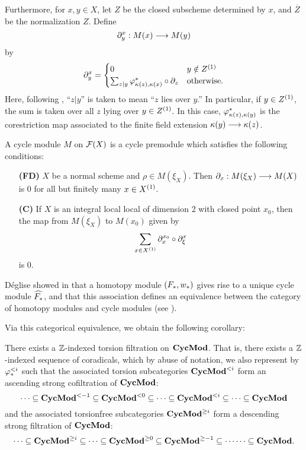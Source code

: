 Furthermore, for $x, y \in X$, let $Z$ be the closed subscheme 
determined by $x$, and $\overline{Z}$ be the normalization $Z$.
Define
\[
\ptres{x}{y}: M(x) \to M(y)
\]
by
\[
\ptres{x}{y} = 
\begin{cases}
0 & y \notin \subsch{1}{Z} \\
\sum_{z|y} \phi_{\resf{z},\resf{x}}^* \comp \res{z} & \textrm{otherwise}.
\end{cases}
\]
Here, following \cite{Rost96}, ``$z|y$'' is taken to mean ``$z$ 
lies over $y$.'' In particular, if $y \in \subsch{1}{Z}$, the sum 
is taken over all $z$ lying over $y \in \subsch{1}{Z}$. In this
case, $\phi_{\resf{z},\resf{y}}^*$ is the corestriction map 
associated to the finite field extension $\resf{y} \to \resf{z}$.

\begin{defn}
A cycle module $M$ on $\fields(X)$ is a cycle premodule which
satisfies the following conditions:

\begin{enumerate}
\item[\textbf{(FD)}]  
$X$ be a normal scheme and $\rho \in M(\xi_X)$. Then $\res{x}: 
M(\xi_X) \to M(X)$ is 0 for all but finitely many $x \in 
\subsch{1}{X}$.

\item[\textbf{(C)}]  If $X$ is an integral
local local of dimension 2 with closed point $x_0$, then the map 
from $M(\xi_X)$ to $M(x_0)$ given by
\[
\sum_{x \in \subsch{1}{X}} \ptres{x_0}{x} \comp \ptres{x}{\xi}
\]
is 0.
\end{enumerate}
\end{defn}

D\'eglise showed in \cite{DegModHom} that a homotopy module $(F_*, 
\deloop_*)$ gives rise to a unique cycle module $\assocCM{F_*}$,
and that this association defines an equivalence between the 
category of homotopy modules and cycle modules (see 
\cite[3.7]{DegModHom}).

Via this categorical equivalence, we obtain the following
corollary: 
\begin{cor}\label{cor_tor_filt_on_CycMod}
There exists a $\Z$-indexed torsion filtration on $\CycMod$. That
is, there exists a $\Z$-indexed sequence of coradicals, which by abuse
of notation, we also represent by $\tlHM{i}$ such that the 
associated torsion subcategories $\TFCycMod{i}$ form an ascending 
strong cofiltration of $\CycMod$:
\[
\cdots \subseteq \TFCycMod{-1} \subseteq \TFCycMod{0} \subseteq \cdots 
   \subseteq \TFCycMod{i} \subseteq \cdots 
   \subseteq \CycMod
\]
and the associated torsionfree subcategories $\TCycMod{i}$
form a descending strong filtration of $\CycMod$:
\[
\cdots \subseteq \TCycMod{i} \subseteq 
   \cdots \subseteq \TCycMod{0} \subseteq \TCycMod{-1} \subseteq \cdots
   \cdots \subseteq \CycMod.
\]
\end{cor}

